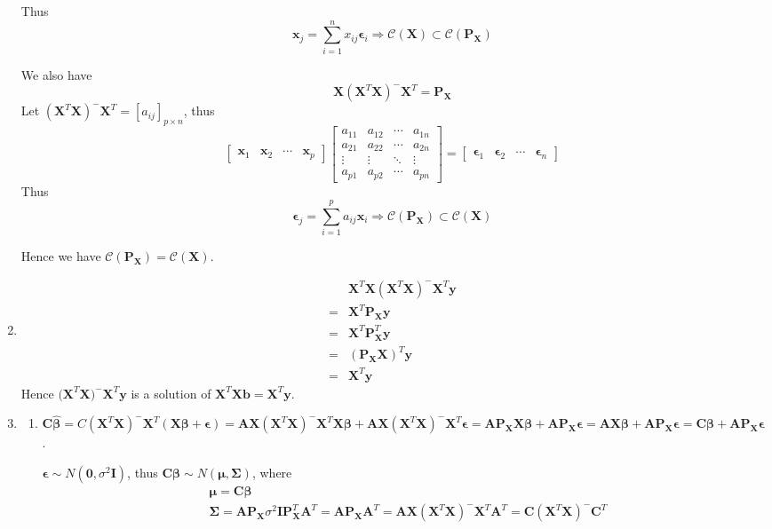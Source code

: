 \documentclass{article}
\begin{document}
\begin{enumerate}[leftmargin = 0 em, label = \arabic*., font = \bfseries]
	Thus 
	\[\bm x_{j} = \sum_{i = 1}^n x_{ij} \bm \epsilon_{i} \Rightarrow \mathcal{C}(\bm X) \subset \mathcal{C}(\bm P_{\bm X})\]

	We also have 
	\[\bm X (\bm X^T \bm X)^- \bm X^T = \bm P_{\bm X}\]
	Let $(\bm X^T \bm X)^- \bm X^T = [a_{ij}]_{p \times n}$, thus
	\[\begin{bmatrix}
		\bm x_1 & \bm x_2 & \cdots & \bm x_p
	\end{bmatrix}  \begin{bmatrix}
		a_{11} & a_{12} & \cdots & a_{1n}\\
		a_{21} & a_{22} & \cdots & a_{2n} \\
		\vdots & \vdots & \ddots & \vdots \\
		a_{p1} & a_{p2} & \cdots & a_{pn}
	\end{bmatrix} = \begin{bmatrix}
		\bm \epsilon_{1} & \bm \epsilon_{2} & \cdots & \bm \epsilon_{n}
	\end{bmatrix}\]
	Thus 
	\[\bm \epsilon_{j} = \sum_{i = 1}^p a_{ij} \bm x_{i} \Rightarrow \mathcal{C}(\bm P_{\bm X}) \subset \mathcal{C}(\bm X)\]

	Hence we have $\mathcal{C}(\bm P_{\bm X}) = \mathcal{C}(\bm X).$


	\item 
	\begin{align*}
	& \bm X^T \bm X (\bm X^T \bm X)^{-}\bm X^T\bm y \\
	 =& \bm X^T \bm P_{\bm X}\bm y \\
	 = &\bm X^T \bm P_{\bm X}^T \bm y\\
	 = &(\bm P_{\bm X} \bm X)^T \bm y\\
	 = &\bm X^T \bm y 
	\end{align*}
	Hence $\bm (\bm X^T \bm X)^{-} \bm X^T \bm y$ is a solution of $\bm X^T \bm X \bm b = \bm X^T \bm y$.


	\item 
	\begin{enumerate}
		\item 
		$\bm C \hat{\bm \beta} = C (\bm X^T \bm X)^- \bm X^T (\bm X \bm \beta + \bm \epsilon) = \bm A \bm X (\bm X^T \bm X)^- \bm X^T \bm X \bm \beta + \bm A \bm X (\bm X^T \bm X)^- \bm X^T \bm \epsilon = \bm A \bm P_{\bm X} \bm X \bm \beta + \bm A \bm P_{\bm X} \bm \epsilon = \bm A \bm X \bm \beta + \bm A \bm P_{\bm X} \bm \epsilon = \bm C \bm \beta + \bm A \bm P_{\bm X} \bm \epsilon$.

		$\bm \epsilon \sim N(\bm 0, \sigma^2 \bm I)$, thus $\bm C \bm \beta \sim N(\bm \mu , \bm \Sigma)$, where
		\begin{align*}
		&\bm \mu = \bm C \bm \beta\\
		&\bm \Sigma = \bm A \bm P_{\bm X} \sigma^2 \bm I \bm P_{\bm X}^T \bm A^T = \bm A \bm P_{\bm X}\bm A^T = \bm A \bm X(\bm X^T \bm X)^- \bm X^T \bm A^T = \bm C (\bm X^T \bm X)^- \bm C^T
		\end{align*}



\end{enumerate}
\end{enumerate}
\end{document}
